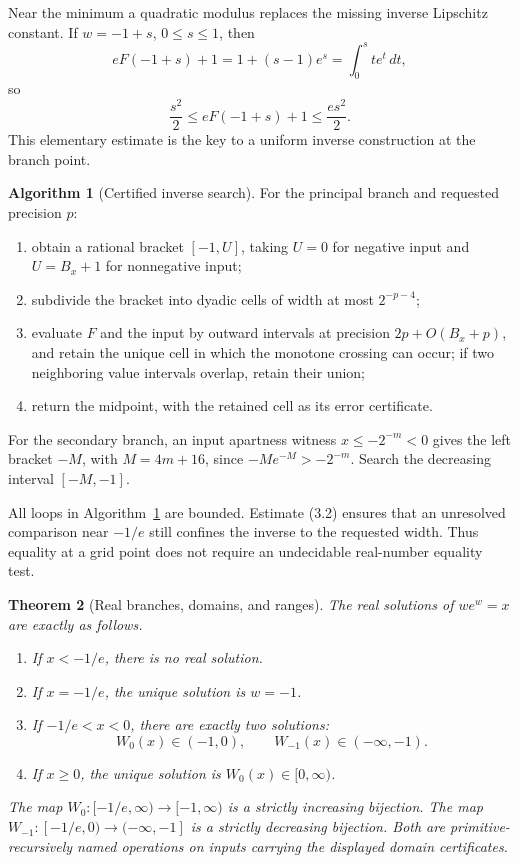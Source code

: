 \documentclass[11pt]{article}
\newtheorem{theorem}{Theorem}[section]
\theoremstyle{definition}
\newtheorem{algorithm}[theorem]{Algorithm}
\newcommand{\Wz}{W_0}
\newcommand{\Wm}{W_{-1}}
\begin{document}
Near the minimum a quadratic modulus replaces the missing inverse Lipschitz
constant.  If \(w=-1+s\), \(0\le s\le1\), then
\[
 eF(-1+s)+1=1+(s-1)e^s=\int_0^s t e^t\,dt,
\]
so
\[
 \frac{s^2}{2}\le eF(-1+s)+1\le\frac{e s^2}{2}.
 \tag{3.2}
\]
This elementary estimate is the key to a uniform inverse construction at the
branch point.

\begin{algorithm}[Certified inverse search]\label{alg:inverse-search}
For the principal branch and requested precision \(p\):
\begin{enumerate}
\item obtain a rational bracket \([-1,U]\), taking \(U=0\) for negative input
and \(U=B_x+1\) for nonnegative input;
\item subdivide the bracket into dyadic cells of width at most \(2^{-p-4}\);
\item evaluate \(F\) and the input by outward intervals at precision
\(2p+O(B_x+p)\), and retain the unique cell in which the monotone crossing can
occur; if two neighboring value intervals overlap, retain their union;
\item return the midpoint, with the retained cell as its error certificate.
\end{enumerate}
For the secondary branch, an input apartness witness
\(x\le-2^{-m}<0\) gives the left bracket \(-M\), with
\(M=4m+16\), since \(-M e^{-M}>-2^{-m}\).  Search the decreasing interval
\([-M,-1]\).
\end{algorithm}

All loops in Algorithm~\ref{alg:inverse-search} are bounded.  Estimate (3.2)
ensures that an unresolved comparison near \(-1/e\) still confines the inverse
to the requested width.  Thus equality at a grid point does not require an
undecidable real-number equality test.

\begin{theorem}[Real branches, domains, and ranges]\label{thm:branches}
The real solutions of \(we^w=x\) are exactly as follows.
\begin{enumerate}[label=\textup{(\roman*)}]
\item If \(x<-1/e\), there is no real solution.
\item If \(x=-1/e\), the unique solution is \(w=-1\).
\item If \(-1/e<x<0\), there are exactly two solutions:
\[
 \Wz(x)\in(-1,0),\qquad \Wm(x)\in(-\infty,-1).
\]
\item If \(x\ge0\), the unique solution is \(\Wz(x)\in[0,\infty)\).
\end{enumerate}
The map \(\Wz:[-1/e,\infty)\to[-1,\infty)\) is a strictly increasing
bijection.  The map \(\Wm:[-1/e,0)\to(-\infty,-1]\) is a strictly decreasing
bijection.  Both are primitive-recursively named operations on inputs carrying
the displayed domain certificates.
\end{theorem}
\end{document}
